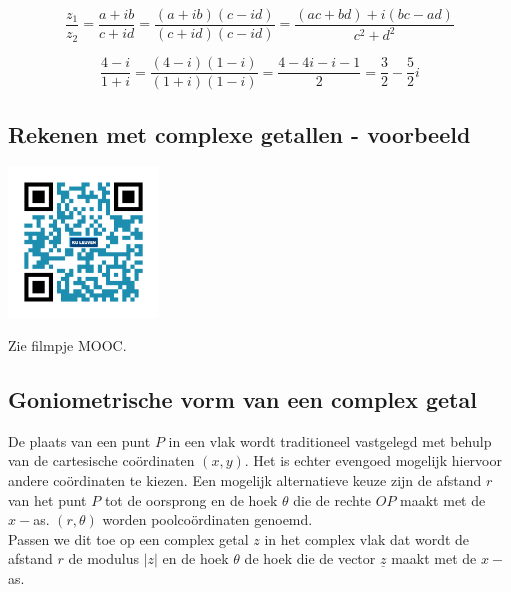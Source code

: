 \begin{framed}
\[ \frac{z_{1}}{z_{2}}=\frac{a+ib}{c+id}=\frac{(a+ib)(c-id)}{(c+id)(c-id)}=\frac{(ac+bd)+i(bc-ad)}{c^2 +d^2}  \]
\end{framed}

\begin{voorbeeld}	
\[ \frac{4-i}{1+i}=\frac{(4-i)(1-i)}{(1+i)(1-i)}=\frac{4-4i-i-1}{2}=\frac{3}{2}-\frac{5}{2}i \]
\end{voorbeeld}

\subsection{Rekenen met complexe getallen - voorbeeld}
\begin{minipage}{.25\linewidth}
	\raggedright
	\includegraphics[width=4cm]{3_gonio_complexe_getallen/inputs/QR_Code_REKENENCOMPLVB_module3}
\end{minipage}
\begin{minipage}{.7\linewidth}
	Zie filmpje MOOC.
\end{minipage}

\subsection{Goniometrische vorm van een complex getal}

De plaats van een punt $P$ in een vlak wordt traditioneel vastgelegd met behulp van de cartesische co\"{o}rdinaten $(x,y)$. Het is echter evengoed mogelijk hiervoor andere co\"{o}rdinaten te kiezen. Een mogelijk alternatieve keuze zijn de afstand $r$ van het punt $P$ tot de oorsprong en de hoek $\theta$ die de rechte $OP$ maakt met de $x-$as. $(r,\theta)$ worden poolco\"{o}rdinaten genoemd.\\
Passen we dit toe op een complex getal $z$ in het complex vlak dat wordt de afstand $r$ de modulus $|z|$ en de hoek $\theta$ de hoek die de vector $\underline{z}$ maakt met de $x-$as.\\

